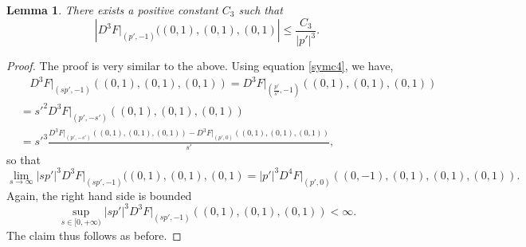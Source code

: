 \documentclass[12pt]{article}
\numberwithin{equation}{section}
\theoremstyle{plain}
\newtheorem{lemma}[theorem]{Lemma}
\theoremstyle{definition}
\theoremstyle{remark}
\begin{document}
\begin{lemma} \label{lem:2.3}
There exists a positive constant $C_3$ such that 
\begin{equation}
  \left|  D^3 F\Big|_{(p',-1)} ((0,1),(0,1),(0,1) \right| \leq \frac{C_3}{|p'|^3}.
\end{equation}
\end{lemma}
\begin{proof} The proof is very similar to the above.
Using equation \eqref{symc4}, we have,
\begin{equation*}
\begin{split}
    & \ \ \ \  D^3 F\Big|_{(sp',-1)} ((0,1),(0,1),(0,1) ) = D^3 F\Big|_{(\frac{p'}{s'},-1)} ((0,1),(0,1),(0,1) ) \\
    & = s'^2 D^3 F\Big|_{(p',-s')} ((0,1),(0,1),(0,1) ) \\
    & = s'^3 \frac{ D^3 F\Big|_{(p',-s')} ((0,1),(0,1),(0,1) ) - D^3 F\Big|_{(p',0)} ((0,1),(0,1),(0,1) ) }{s'},
\end{split}
\end{equation*}
so that
\begin{equation*}
    \lim_{s\rightarrow \infty} |sp'|^3 D^3 F\Big|_{(sp',-1)} ((0,1),(0,1),(0,1) = |p'|^3 D^4 F\Big|_{(p',0)} ((0,-1),(0,1),(0,1),(0,1) ).
\end{equation*}
Again, the right hand side is bounded 
\begin{equation*}
    \sup_{s\in[0,+\infty)} |sp'|^3 D^3 F\Big|_{(sp',-1)} ((0,1),(0,1),(0,1)) < \infty.
\end{equation*}
The claim thus follows as before.
\end{proof}
\end{document}
